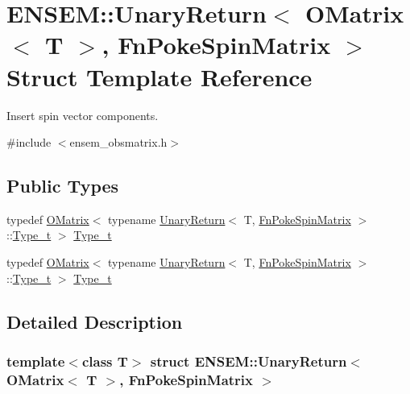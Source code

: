 \hypertarget{structENSEM_1_1UnaryReturn_3_01OMatrix_3_01T_01_4_00_01FnPokeSpinMatrix_01_4}{}\section{E\+N\+S\+EM\+:\+:Unary\+Return$<$ O\+Matrix$<$ T $>$, Fn\+Poke\+Spin\+Matrix $>$ Struct Template Reference}
\label{structENSEM_1_1UnaryReturn_3_01OMatrix_3_01T_01_4_00_01FnPokeSpinMatrix_01_4}


Insert spin vector components.  




{\ttfamily \#include $<$ensem\+\_\+obsmatrix.\+h$>$}

\subsection*{Public Types}
\begin{DoxyCompactItemize}
\item 
typedef \mbox{\hyperlink{classENSEM_1_1OMatrix}{O\+Matrix}}$<$ typename \mbox{\hyperlink{structENSEM_1_1UnaryReturn}{Unary\+Return}}$<$ T, \mbox{\hyperlink{structENSEM_1_1FnPokeSpinMatrix}{Fn\+Poke\+Spin\+Matrix}} $>$\+::\mbox{\hyperlink{structENSEM_1_1UnaryReturn_3_01OMatrix_3_01T_01_4_00_01FnPokeSpinMatrix_01_4_a2018c95323ea7832f6e1e071be4629b8}{Type\+\_\+t}} $>$ \mbox{\hyperlink{structENSEM_1_1UnaryReturn_3_01OMatrix_3_01T_01_4_00_01FnPokeSpinMatrix_01_4_a2018c95323ea7832f6e1e071be4629b8}{Type\+\_\+t}}
\item 
typedef \mbox{\hyperlink{classENSEM_1_1OMatrix}{O\+Matrix}}$<$ typename \mbox{\hyperlink{structENSEM_1_1UnaryReturn}{Unary\+Return}}$<$ T, \mbox{\hyperlink{structENSEM_1_1FnPokeSpinMatrix}{Fn\+Poke\+Spin\+Matrix}} $>$\+::\mbox{\hyperlink{structENSEM_1_1UnaryReturn_3_01OMatrix_3_01T_01_4_00_01FnPokeSpinMatrix_01_4_a2018c95323ea7832f6e1e071be4629b8}{Type\+\_\+t}} $>$ \mbox{\hyperlink{structENSEM_1_1UnaryReturn_3_01OMatrix_3_01T_01_4_00_01FnPokeSpinMatrix_01_4_a2018c95323ea7832f6e1e071be4629b8}{Type\+\_\+t}}
\end{DoxyCompactItemize}


\subsection{Detailed Description}
\subsubsection*{template$<$class T$>$\newline
struct E\+N\+S\+E\+M\+::\+Unary\+Return$<$ O\+Matrix$<$ T $>$, Fn\+Poke\+Spin\+Matrix $>$}

